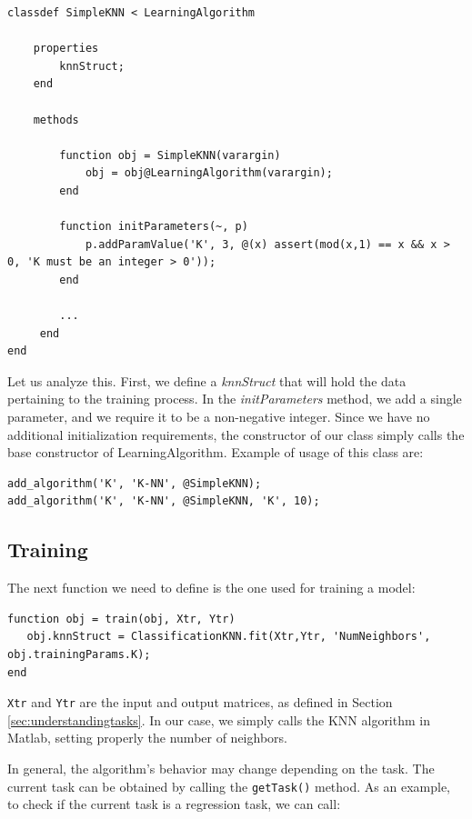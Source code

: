 \begin{lstlisting}
classdef SimpleKNN < LearningAlgorithm
    
    properties
        knnStruct;
    end
    
    methods
        
        function obj = SimpleKNN(varargin)
            obj = obj@LearningAlgorithm(varargin);
        end
        
        function initParameters(~, p)
            p.addParamValue('K', 3, @(x) assert(mod(x,1) == x && x > 0, 'K must be an integer > 0'));
        end
        
        ...
     end
end
\end{lstlisting}

Let us analyze this. First, we define a \textit{knnStruct} that will hold the data pertaining to the training process. In the \textit{initParameters} method, we add a single parameter, and we require it to be a non-negative integer. Since we have no additional initialization requirements, the constructor of our class simply calls the base constructor of LearningAlgorithm. Example of usage of this class are:

\begin{lstlisting}
add_algorithm('K', 'K-NN', @SimpleKNN);
add_algorithm('K', 'K-NN', @SimpleKNN, 'K', 10);
\end{lstlisting}

\subsection{Training}

The next function we need to define is the one used for training a model:

\begin{lstlisting}
function obj = train(obj, Xtr, Ytr)
   obj.knnStruct = ClassificationKNN.fit(Xtr,Ytr, 'NumNeighbors', obj.trainingParams.K);                    
end
\end{lstlisting}

\verb|Xtr| and \verb|Ytr| are the input and output matrices, as defined in Section \ref{sec:understandingtasks}. In our case, we simply calls the KNN algorithm in Matlab, setting properly the number of neighbors.

In general, the algorithm's behavior may change depending on the task. The current task can be obtained by calling the \verb|getTask()| method. As an example, to check if the current task is a regression task, we can call:

